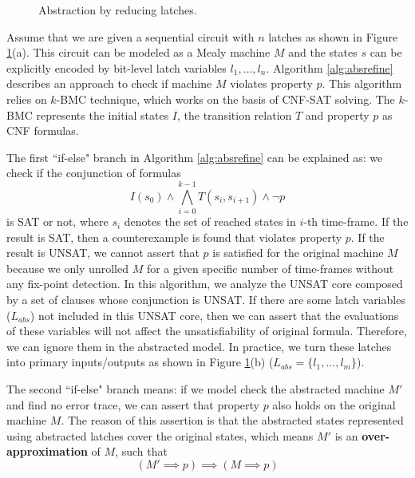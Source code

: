 \begin{figure}[h]
\caption{Abstraction by reducing latches.}
\label{fig:refine}
\end{figure}
Assume that we are given a sequential circuit with $n$ latches as shown in Figure \ref{fig:refine}(a). 
This circuit can be modeled as a Mealy machine $M$ and the states $s$ can be explicitly encoded by bit-level latch variables 
$l_1,\dots,l_n$. Algorithm \ref{alg:absrefine} describes an approach to check if machine $M$ violates property $p$.
This algorithm relies on $k$-BMC technique, which works on the basis of CNF-SAT solving.
The $k$-BMC represents the initial states $I$, the transition relation $T$ and property $p$ as CNF formulas.

The first ``if-else" branch in Algorithm \ref{alg:absrefine} can be
explained as: we check if the conjunction of formulas 
$$I(s_0)\land \bigwedge_{i=0}^{k-1}T(s_i,s_{i+1}) \land \neg p$$
is SAT or not, where $s_i$ denotes the set of reached states in $i$-th time-frame. If the result is
SAT, then a counterexample is found that violates property $p$. If the result is UNSAT, we cannot
assert that $p$ is satisfied for the original machine $M$ because we only unrolled $M$ for a given specific number of time-frames
without any fix-point detection.
In this algorithm, we analyze the UNSAT core composed by a set of clauses whose conjunction is UNSAT.
If there are some latch variables ($L_{abs}$) not included in this UNSAT core, then we can assert that the evaluations of 
these variables will not affect the unsatisfiability of original formula. Therefore, we can ignore them in the abstracted model.
In practice, we turn these latches into primary inputs/outputs as shown in Figure \ref{fig:refine}(b) ($L_{abs} = \{l_1,\dots,l_m\}$).


The second ``if-else" branch means: if we model check the abstracted machine $M'$ and find no
error trace, we can assert that property $p$ also holds on the original machine $M$. The reason of this assertion is that
the abstracted states represented using abstracted latches cover the original states, which means $M'$ is an {\bf over-approximation}
of $M$, such that 
$$(M'\implies p) \implies (M\implies p)$$ 

